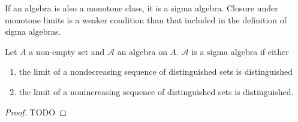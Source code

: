 
\sbasic




\sstart



If an algebra is also
a monotone class,
it is a sigma algebra.
Closure under monotone limits
is a weaker
condition than that included
in the definition of sigma
algebras.


\begin{prop}

Let $A$ a non-empty set and
$\mathcal{A}$ an algebra on $A$.
$\mathcal{A}$ is a sigma algebra
if either
\begin{enumerate}
  \item
  the limit of a nondecreasing
  sequence of distinguished sets
  is distinguished

  \item
  the limit of a nonincreasing
  sequence of distinguished sets
  is distinguished.
\end{enumerate}

\begin{proof}
TODO
\end{proof}

\end{prop}

\strats
